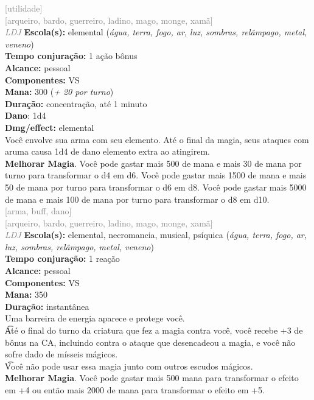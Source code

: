 \documentclass{RPG_Adventure}[2021/10/20]
\begin{document}
{\scriptsize \textcolor{gray}{[utilidade]\\}}
{\scriptsize \textcolor{gray}{[arqueiro, bardo, guerreiro, ladino, mago, monge, xamã]\\}}
{\tiny \textcolor{gray}{\textit{LDJ}}}\jump{}
{\small \t \textbf{Escola(s):} elemental (\textit{água, terra, fogo, ar, luz, sombras, relâmpago, metal, veneno})\\\t \textbf{Tempo conjuração:} 1 ação bônus\\\t \textbf{Alcance:} pessoal\\\t \textbf{Componentes:} VS\\\t \textbf{Mana:} 300 (\textit{+ 20 por turno})\\\t \textbf{Duração:} concentração, até 1 minuto\\\t \textbf{Dano}: 1d4\\\t \textbf{Dmg/effect:} elemental\\}
{\normalsize Você envolve sua arma com seu elemento. Até o final da magia, seus ataques com aruma causa 1d4 de dano elemento extra ao atingirem.\\\t \textbf{Melhorar Magia}. Você pode gastar mais 500 de mana e mais 30 de mana por turno para transformar o d4 em d6. Você pode gastar mais 1500 de mana e mais 50 de mana por turno para transformar o d6 em d8. Você pode gastar mais 5000 de mana e mais 100 de mana por turno para transformar o d8 em d10.\\}
{\scriptsize \textcolor{gray}{[arma, buff, dano]\\}}
{\scriptsize \textcolor{gray}{[arqueiro, bardo, guerreiro, ladino, mago, monge, xamã]\\}}
{\tiny \textcolor{gray}{\textit{LDJ}}}\jump{}
{\small \t \textbf{Escola(s):} elemental, necromancia, musical, psíquica (\textit{água, terra, fogo, ar, luz, sombras, relâmpago, metal, veneno})\\\t \textbf{Tempo conjuração:} 1 reação\\\t \textbf{Alcance:} pessoal\\\t \textbf{Componentes:} VS\\\t \textbf{Mana:} 350\\\t \textbf{Duração:} instantânea\\}
{\normalsize Uma barreira de energia aparece e protege você.\\\t Até o final do turno da criatura que fez a magia contra você, você recebe +3 de bônus na CA, incluindo contra o ataque que desencadeou a magia, e você não sofre dado de mísseis mágicos.\\\t Você não pode usar essa magia junto com outros escudos mágicos.\\\t \textbf{Melhorar Magia}. Você pode gastar mais 500 mana para transformar o efeito em +4 ou então mais 2000 de mana para transformar o efeito em +5.\\}
\end{document}
